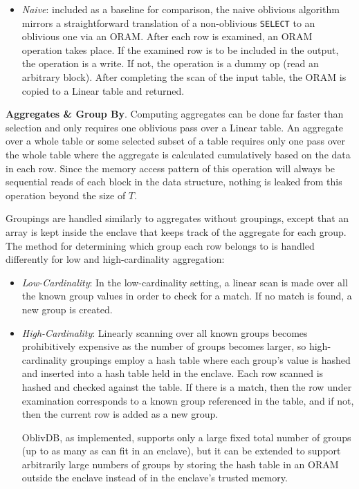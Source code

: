\documentclass[letterpaper,twocolumn,10pt]{article}
\def\name/{OblivDB}
\begin{document}
\begin{itemize}[itemsep=0pt,parsep=0pt]
\item \textit{Naive}: included as a baseline for comparison, the naive oblivious algorithm mirrors a straightforward translation of a non-oblivious \texttt{SELECT} to an oblivious one via an ORAM. After each row is examined, an ORAM operation takes place. If the examined row is to be included in the output, the operation is a write. If not, the operation is a dummy op (read an arbitrary block). After completing the scan of the input table, the ORAM is copied to a Linear table and returned.
\end{itemize}

  \noindent \textbf{Aggregates \& Group By}. 
Computing aggregates can be done far faster than selection and only requires one oblivious pass over a Linear table. An aggregate over a whole table or some selected subset of a table requires only one pass over the whole table where the aggregate is calculated cumulatively based on the data in each row. Since the memory access pattern of this operation will always be sequential reads of each block in the data structure, nothing is leaked from this operation beyond the size of $T$. 

Groupings are handled similarly to aggregates without groupings, except that an array is kept inside the enclave that keeps track of the aggregate for each group. The method for determining which group each row belongs to is handled differently for low and high-cardinality aggregation:
\begin{itemize}[itemsep=0pt,parsep=0pt]
\item \textit{Low-Cardinality}: In the low-cardinality setting, a linear scan is made over all the known group values in order to check for a match. If no match is found, a new group is created. 

\item \textit{High-Cardinality}: Linearly scanning over all known groups becomes prohibitively expensive as the number of groups becomes larger, so high-cardinality groupings employ a hash table where each group's value is hashed and inserted into a hash table held in the enclave. Each row scanned is hashed and checked against the table. If there is a match, then the row under examination corresponds to a known group referenced in the table, and if not, then the current row is added as a new group. 

\name/, as implemented, supports only a large fixed total number of groups (up to as many as can fit in an enclave), but it can be extended to support arbitrarily large numbers of groups by storing the hash table in an ORAM outside the enclave instead of in the enclave's trusted memory. 
\end{itemize}
\end{document}
